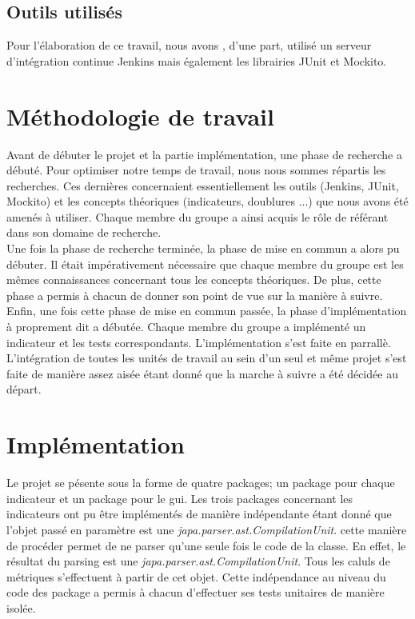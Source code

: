 \documentclass[11pt]{report}
\begin{document}
	\section{Outils utilisés}
	Pour l'élaboration de ce travail, nous avons , d'une part, utilisé un serveur d'intégration continue Jenkins mais également les librairies JUnit et Mockito. 

\chapter{Méthodologie de travail}
Avant de débuter le projet et la partie implémentation, une phase de recherche a débuté. Pour optimiser notre temps de travail, nous nous sommes répartis les recherches. Ces dernières concernaient essentiellement les outils (Jenkins, JUnit, Mockito)  et les concepts théoriques (indicateurs, doublures ...) que nous avons été amenés à utiliser. Chaque membre du groupe a ainsi acquis le rôle de référant dans son domaine de recherche.\\ 

Une fois la phase de recherche terminée, la phase de mise en commun a alors pu débuter. Il était impérativement nécessaire que chaque membre du groupe est les mêmes connaissances concernant tous les concepts théoriques. De plus, cette phase a permis à chacun de donner son point de vue sur la manière à suivre.\\ 

Enfin, une fois cette phase de mise en commun passée, la phase d'implémentation à proprement dit a débutée. Chaque membre du groupe a implémenté un indicateur et les tests correspondants. L'implémentation s'est faite en parrallè. L'intégration de toutes les unités de travail au sein d'un seul et même projet s'est faite de manière assez aisée étant donné que la marche à suivre a été décidée au départ. \\ 

\chapter{Implémentation}

	Le projet se pésente sous la forme de quatre packages; un package pour chaque indicateur et un package pour le gui. Les trois packages concernant les indicateurs ont pu être implémentés de manière indépendante étant donné que l'objet passé en paramètre est une \textit{japa.parser.ast.CompilationUnit}. cette manière de procéder permet de ne parser qu'une seule fois le code de la classe. En effet, le résultat du parsing est une \textit{japa.parser.ast.CompilationUnit}. Tous les caluls de métriques s'effectuent à partir de cet objet. Cette indépendance au niveau du code des package a permis à chacun d'effectuer ses tests unitaires de manière isolée.
	
\end{document}
